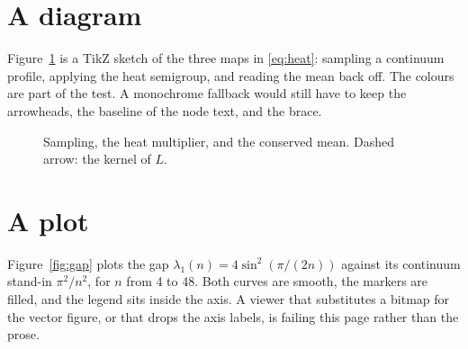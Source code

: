 \documentclass[10pt,twocolumn]{article}
\theoremstyle{definition}
\begin{document}
\section{A diagram}
\label{sec:diagram}
Figure~\ref{fig:flow} is a TikZ sketch of the three maps in \eqref{eq:heat}: sampling a continuum profile, applying the heat semigroup, and reading the mean back off. The colours are part of the test. A monochrome fallback would still have to keep the arrowheads, the baseline of the node text, and the brace.

\begin{figure}[t]
\centering
{}
\caption{Sampling, the heat multiplier, and the conserved mean. Dashed arrow: the kernel of \(L\).}
\label{fig:flow}
\end{figure}

\section{A plot}
\label{sec:plot}
Figure~\ref{fig:gap} plots the gap \(\lambda_1(n)=4\sin^2(\pi/(2n))\) against its continuum stand-in \(\pi^2/n^2\), for \(n\) from 4 to 48. Both curves are smooth, the markers are filled, and the legend sits inside the axis. A viewer that substitutes a bitmap for the vector figure, or that drops the axis labels, is failing this page rather than the prose.
\end{document}
